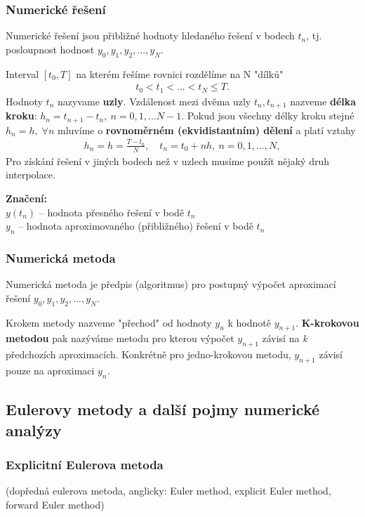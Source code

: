 \subsubsection*{Numerické řešení}
Numerické řešení jsou přibližné hodnoty hledaného řešení v bodech $t_{n}$, tj. posloupnost hodnost  $y_{0}, y_{1}, y_{2},...,y_{N}$. 

Interval $[t_{0}, T]$ na  kterém řešíme rovnici rozdělíme na N "dílků"
\begin{align}
t_{0} <  t_{1}< ... < t_{N} \leq T. 
\end{align} 
Hodnoty $t_{n}$ nazyvame \textbf{uzly}. 
Vzdálenost mezi dvěma uzly $t_{n}, t_{n+1}$ nazveme \textbf{délka kroku}: $h_{n}=t_{n+1}-t_{n}, \: n=0,1,...N-1$. Pokud jsou všechny délky kroku stejné $h_{n}=h,\; \forall n$ mluvíme o \textbf{rovnoměrném (ekvidistantním) dělení} a  platí vztahy
\begin{align}
h_{n}=h= \frac{T-t_{0}}{N}, \quad t_{n}=t_{0}+nh, \: n =0,1,...,N,
\end{align}
Pro získání řešení v jiných bodech než v uzlech musíme použít nějaký druh interpolace. 

\textbf{Značení:} \\
$y(t_{n})$ -- hodnota přesného řešení v bodě $t_{n}$ \\
$y_{n}$ -- hodnota aproximovaného (přibližného) řešení v bodě $t_{n}$

\subsubsection*{Numerická metoda}
Numerická metoda je předpis (algoritmus) pro postupný výpočet aproximací řešení   $y_{0}, y_{1}, y_{2},...,y_{N}$.

Krokem metody nazveme "přechod" od hodnoty $y_{n}$ k hodnotě $y_{n+1}$. \textbf{K-krokovou metodou} pak nazýváme metodu pro kterou výpočet $y_{n+1}$ závisí na \textit{k} předchozích aproximacích. Konkrétně pro jedno-krokovou metodu, $y_{n+1}$ závisí pouze na aproximaci $y_{n}$.

\subsection{Eulerovy metody a další pojmy numerické analýzy}
\subsubsection*{Explicitní Eulerova metoda}
  (dopředná eulerova metoda, anglicky: Euler method, explicit Euler method, forward Euler method)

